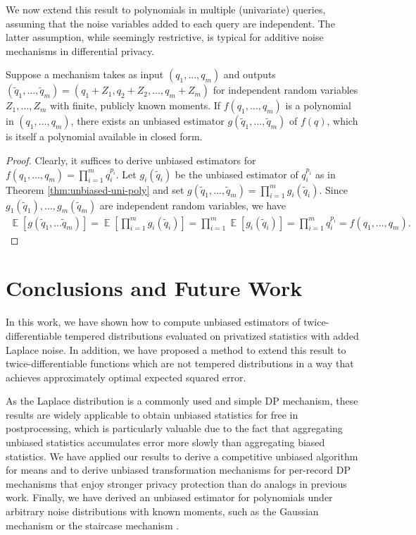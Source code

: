 \documentclass[11pt]{article}
\newcommand{\E}{\operatorname{\mathbb{E}}}
\begin{document}
We now extend this result to polynomials in multiple (univariate) queries, assuming that the noise variables added to each query are independent. The latter assumption, while seemingly restrictive, is typical for additive noise mechanisms in differential privacy.
\begin{theorem}
    Suppose a mechanism takes as input $(q_1,\dots, q_m)$ and outputs $(\tilde q_1,\dots,\tilde q_m) = (q_1+Z_1, q_2+Z_2, \dots, q_m+Z_m)$ for independent random variables $Z_1,\dots,Z_m$ with finite, publicly known moments.
    If $f(q_1,\dots,q_m)$ is a polynomial in $(q_1,\dots,q_m)$, there exists an unbiased estimator $g(\tilde q_1,\dots,\tilde q_m)$ of $f(q)$, which is itself a polynomial available in closed form.
\end{theorem}
\begin{proof}
Clearly, it suffices to derive unbiased estimators for $f(q_1,\dots, 
q_m)=\prod_{i=1}^m q_i^{p_i}$.
Let $g_i(\tilde q_i)$ be the unbiased estimator of $q_i^{p_i}$ as in Theorem \ref{thm:unbiased-uni-poly} and set $g(\tilde q_1,\dots,\tilde q_m) = \prod_{i=1}^m g_i(\tilde q_i)$.
Since $g_1(\tilde q_1),\dots,g_m(\tilde q_m)$ are independent random variables, we have
\begin{align}
    \E[g(\tilde q_1,\dots \tilde q_m)]= \E\left[\prod_{i=1}^m g_i(\tilde q_i)\right] = \prod_{i=1}^m \E\left[g_i(\tilde q_i)\right] = \prod_{i=1}^m q_i^{p_i} = f(q_1,\dots,q_m).
\end{align}
\end{proof}



\section{Conclusions and Future Work}
In this work, we have shown how to compute unbiased estimators of twice-differentiable tempered distributions evaluated on privatized statistics with added Laplace noise. In addition, we have proposed a method to extend this result to twice-differentiable functions which are not tempered distributions in a way that achieves approximately optimal expected squared error.

As the Laplace distribution is a commonly used and simple DP mechanism, these results are widely applicable to obtain unbiased statistics for free in postprocessing, which is particularly valuable due to the fact that aggregating unbiased statistics accumulates error more slowly than aggregating biased statistics. We have applied our results to derive a competitive unbiased algorithm for means and to derive unbiased transformation mechanisms for per-record DP mechanisms that enjoy stronger privacy protection than do analogs in previous work. Finally, we have derived an unbiased estimator for polynomials under arbitrary noise distributions with known moments, such as the Gaussian mechanism or the staircase mechanism \cite{dwork06, staircase}.
\end{document}
